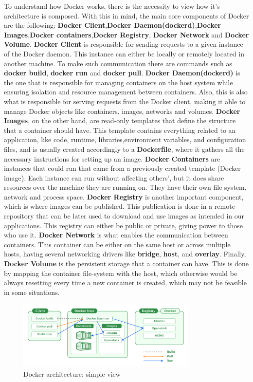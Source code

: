 To understand how Docker works, there is the necessity to view how it's architecture is composed. With this in mind, the main core components of Docker are the following: \textbf{Docker Client},\textbf{Docker Daemon(dockerd)},\textbf{Docker Images},\textbf{Docker containers},\textbf{Docker Registry}, \textbf{Docker Network} and \textbf{Docker Volume}. \textbf{Docker Client} is responsible for sending requests to a given instance of the Docker daemon. This instance can either be locally or remotely located in another machine. To make such communication there are commands such as \textbf{docker build}, \textbf{docker run} and \textbf{docker pull}. \textbf{Docker Daemon(dockerd)} is the one that is responsible for managing containers on the host system while ensuring isolation and resource management between containers. Also, this is also what is responsible for serving requests from the Docker client, making it able to manage Docker objects like containers, images, networks and volumes. \textbf{Docker Images}, on the other hand, are read-only templates that define the structure that a container should have. This template contains everything related to an application, like code, runtime, libraries,environment variables, and configuration files, and is usually created accordingly to a \textbf{Dockerfile}, where it gathers all the necessary instructions for setting up an image. \textbf{Docker Containers} are instances that could run that came from a previously created template (Docker image). Each instance can run without affecting others', but it does share resources over the machine they are running on. They have their own file system, network and process space. \textbf{Docker Registry} is another important component, which is where images can be published. This publication is done in a remote repository that can be later used to download and use images as intended in our applications. This registry can either be public or private, giving power to those who use it. \textbf{Docker Network} is what enables the communication between containers. This container can be either on the same host or across multiple hosts, having several networking drivers like \textbf{bridge}, \textbf{host}, and \textbf{overlay}. Finally, \textbf{Docker Volume} is the persistent storage that a container can have. This is done by mapping the container file-system with the host, which otherwise would be always resetting every time a new container is created, which may not be feasible in some situations.
\begin{figure}[H]
    \centering
    \includegraphics[width=0.8\textwidth]{assets/tools/docker/Architecture-of-Docker.png} %
    \caption{Docker architecture: simple view}
    \label{fig:sample-image} 
\end{figure}

